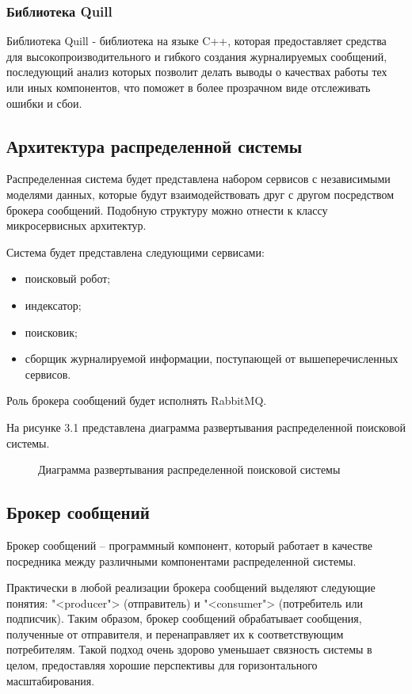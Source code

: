 \subsubsection{Библиотека Quill}
Библиотека Quill - библиотека на языке C++, которая предоставляет средства для высокопроизводительного и гибкого создания журналируемых сообщений, последующий анализ которых позволит делать выводы о качествах работы тех или иных компонентов, что поможет в более прозрачном виде отслеживать ошибки и сбои.

\subsection{Архитектура распределенной системы}

Распределенная система будет представлена набором сервисов с независимыми моделями данных, которые будут взаимодействовать друг с другом посредством брокера сообщений. Подобную структуру можно отнести к классу микросервисных архитектур.

Система будет представлена следующими сервисами:
\begin{itemize}
\item поисковый робот;
\item индексатор;
\item поисковик;
\item сборщик журналируемой информации, поступающей от вышеперечисленных сервисов.
\end{itemize}

Роль брокера сообщений будет исполнять RabbitMQ.

На рисунке 3.1 представлена диаграмма развертывания распределенной поисковой системы.

\begin{figure}[H]
\caption{Диаграмма развертывания распределенной поисковой системы}
\label{diagram_deployment:image}
\end{figure}

\subsection{Брокер сообщений}

Брокер сообщений -- программный компонент, который работает в качестве посредника между различными компонентами распределенной системы. 

Практически в любой реализации брокера сообщений выделяют следующие понятия: "<producer"> (отправитель) и "<consumer"> (потребитель или подписчик). Таким образом, брокер сообщений обрабатывает сообщения, полученные от отправителя, и перенаправляет их к соответствующим потребителям. Такой подход очень здорово уменьшает связность системы в целом, предоставляя хорошие перспективы для горизонтального масштабирования.

